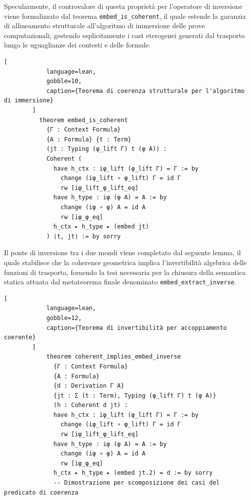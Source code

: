 Specularmente, il controvalore di questa proprietà per l'operatore di inversione viene formalizzato dal teorema \texttt{embed\_is\_coherent}, il quale estende la garanzia di allineamento strutturale all'algoritmo di immersione 
delle prove computazionali, gestendo esplicitamente i cast eterogenei generati dal trasporto lungo le uguaglianze dei contesti e delle formule.
\begin{center}
    \begin{minipage}{\textwidth}
        \begin{lstlisting}[
            language=lean, 
            gobble=10,
            caption={Teorema di coerenza strutturale per l'algoritmo di immersione}
        ]
          theorem embed_is_coherent 
            {Γ : Context Formula} 
            {A : Formula} {t : Term}
            (jt : Typing (φ_lift Γ) t (φ A)) :
            Coherent (
              have h_ctx : iφ_lift (φ_lift Γ) = Γ := by
                change (iφ_lift ∘ φ_lift) Γ = id Γ
                rw [iφ_lift_φ_lift_eq]
              have h_type : iφ (φ A) = A := by
                change (iφ ∘ φ) A = id A
                rw [iφ_φ_eq]
              h_ctx ▸ h_type ▸ (embed jt)
            ) ⟨t, jt⟩ := by sorry
        \end{lstlisting}
    \end{minipage}
\end{center}
Il ponte di inversione tra i due mondi viene completato dal seguente lemma, il quale stabilisce che la coherence geometrica implica l'invertibilità algebrica delle funzioni di trasporto, 
fornendo la tesi necessaria per la chiusura della semantica statica attuata dal metateorema finale denominato \texttt{embed\_extract\_inverse}.
\begin{center}
    \begin{minipage}{\textwidth}
        \begin{lstlisting}[
            language=lean, 
            gobble=12,
            caption={Teorema di invertibilità per accoppiamento coerente}
        ]
            theorem coherent_implies_embed_inverse 
              {Γ : Context Formula} 
              {A : Formula}
              {d : Derivation Γ A} 
              {jt : Σ (t : Term), Typing (φ_lift Γ) t (φ A)}
              (h : Coherent d jt) :
              have h_ctx : iφ_lift (φ_lift Γ) = Γ := by
                change (iφ_lift ∘ φ_lift) Γ = id Γ
                rw [iφ_lift_φ_lift_eq]
              have h_type : iφ (φ A) = A := by
                change (iφ ∘ φ) A = id A
                rw [iφ_φ_eq]
              h_ctx ▸ h_type ▸ (embed jt.2) = d := by sorry
              -- Dimostrazione per scomposizione dei casi del predicato di coerenza
        \end{lstlisting}
    \end{minipage}
\end{center}
